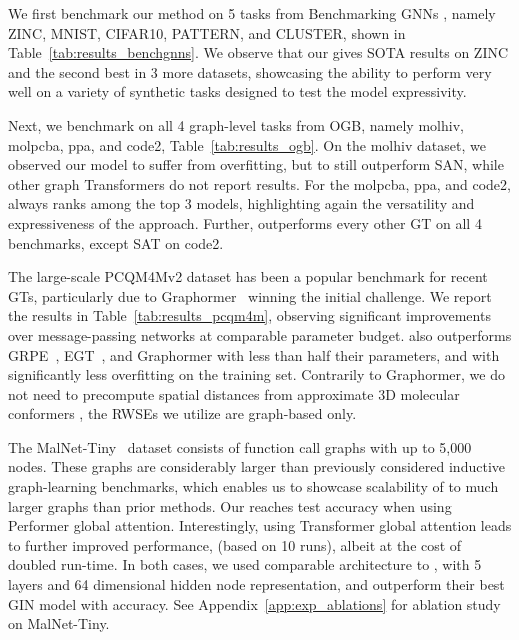 \documentclass{article}
\begin{document}
We first benchmark our method on 5 tasks from Benchmarking GNNs \cite{dwivedi2020benchmarking}, namely ZINC, MNIST, CIFAR10, PATTERN, and CLUSTER, shown in Table~\ref{tab:results_benchgnns}. We observe that our \method gives SOTA results on ZINC and the second best in 3 more datasets, showcasing the ability to perform very well on a variety of synthetic tasks designed to test the model expressivity.

Next, we benchmark on all 4 graph-level tasks from OGB, namely molhiv, molpcba, ppa, and code2, Table~\ref{tab:results_ogb}. On the molhiv dataset, we observed our model to suffer from overfitting, but to still outperform SAN, while other graph Transformers do not report results. For the molpcba, ppa, and code2, \method always ranks among the top 3 models, highlighting again the versatility and expressiveness of the \method approach. Further, \method outperforms every other GT on all 4 benchmarks, except SAT on code2.

The large-scale PCQM4Mv2 dataset has been a popular benchmark for recent GTs, particularly due to Graphormer~\cite{ying2021graphormer} winning the initial challenge. We report the results in Table~\ref{tab:results_pcqm4m}, observing significant improvements over message-passing networks at comparable parameter budget. \method also outperforms GRPE~\cite{park2022GRPE}, EGT~\cite{hussain2022EGT}, and Graphormer \cite{ying2021graphormer} with less than half their parameters, and with significantly less overfitting on the training set.
Contrarily to Graphormer, we do not need to precompute spatial distances from approximate 3D molecular conformers \cite{ying2021first}, the RWSEs we utilize are graph-based only.

The MalNet-Tiny~\cite{freitas2021malnet} dataset consists of function call graphs with up to 5,000 nodes. These graphs are considerably larger than previously considered inductive graph-learning benchmarks, which enables us to showcase scalability of \method to much larger graphs than prior methods. Our \method reaches  test accuracy when using Performer global attention. Interestingly, using Transformer global attention leads to further improved \method performance,  (based on 10 runs), albeit at the cost of doubled run-time. In both cases, we used comparable architecture to \citet{freitas2021malnet}, with 5 layers and 64 dimensional hidden node representation, and outperform their best GIN model with  accuracy. See Appendix~\ref{app:exp_ablations} for \method ablation study on MalNet-Tiny.
\end{document}
